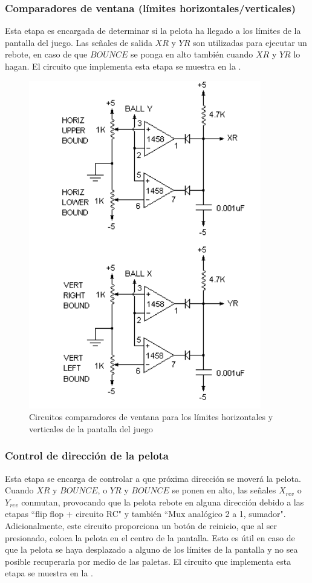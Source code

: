 \subsubsection{Comparadores de ventana (límites horizontales/verticales)}
Esta etapa es encargada de determinar si la pelota ha llegado a los límites de la pantalla del juego.
Las señales de salida $XR$ y $YR$ son utilizadas para ejecutar un rebote, en caso de que $BOUNCE$ se ponga en alto también cuando $XR$ y $YR$ lo hagan. 
El circuito que implementa esta etapa se muestra en la .

\begin{figure}[H]
    \centering
    \includegraphics[width=0.5\linewidth]{figs/descripcion/hv.png}
    \caption{Circuitos comparadores de ventana para los límites horizontales y verticales de la pantalla del juego \cite{pong}}
    \label{limites}
\end{figure}

\subsubsection{Control de dirección de la pelota}
Esta etapa se encarga de controlar a que próxima dirección se moverá la pelota.
Cuando $XR$ y $BOUNCE$, o $YR$ y $BOUNCE$ se ponen en alto, las señales $X_{rev}$ o $Y_{rev}$ conmutan, provocando que la pelota rebote en alguna dirección debido a las etapas ``flip flop + circuito RC" y también ``Mux analógico 2 a 1, sumador". 
Adicionalmente, este circuito proporciona un botón de reinicio, que al ser presionado, coloca la pelota en el centro de la pantalla.
Esto es útil en caso de que la pelota se haya desplazado a alguno de los límites de la pantalla y no sea posible recuperarla por medio de las paletas.
El circuito que implementa esta etapa se muestra en la .

